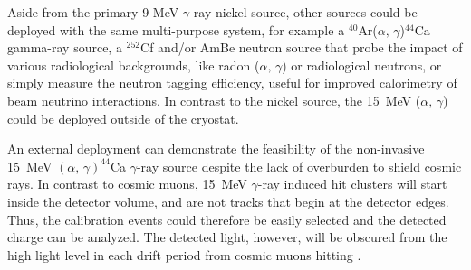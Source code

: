 
Aside from the primary
9 MeV $\gamma$-ray nickel source, other sources could be deployed with the same multi-purpose system, for example a $^{40}$Ar($\alpha,\,\gamma$)$^{44}$Ca gamma-ray source, a $^{252}$Cf and/or AmBe neutron source that probe the impact of various radiological backgrounds, like radon ($\alpha,\,\gamma$) or radiological neutrons, or simply measure the neutron tagging efficiency, useful for improved calorimetry of beam neutrino interactions. 
In contrast to the nickel source, the \SI{15}{\MeV} ($\alpha,\,\gamma$) could be deployed outside of the cryostat.

An external  deployment can demonstrate the feasibility of the non-invasive \SI{15}{MeV} $(\alpha,\,\gamma)^{44}$Ca $\gamma$-ray source despite the lack of overburden to shield cosmic rays. In contrast to cosmic muons, \SI{15}{MeV} $\gamma$-ray induced hit clusters will start inside the detector volume, and are not tracks that begin at the detector edges. Thus, the  calibration events could therefore be easily selected and the detected charge can be analyzed. The detected light, however, will be obscured from the high light level in each drift period from cosmic muons hitting . 

